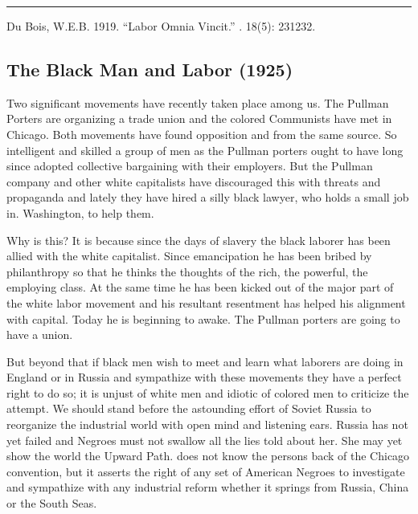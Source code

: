 \documentclass[letterpaper,10pt,english]{jupyterBook}
\begin{document}
\bigskip\hrule\bigskip


\sphinxAtStartPar
{} Du Bois, W.E.B. 1919. “Labor Omnia Vincit.” . 18(5): 231\sphinxhyphen{}232.


\subsection{The Black Man and Labor (1925)}
\label{\detokenize{Volumes/31/02/black_man_and_labor:the-black-man-and-labor-1925}}\label{\detokenize{Volumes/31/02/black_man_and_labor::doc}}
\sphinxAtStartPar
Two significant movements have recently taken place among us. The Pullman Porters are organizing a trade union and the colored Communists have met in Chicago. Both movements have found opposition and from the same source. So intelligent and skilled a group of men as the Pullman porters ought to have long since adopted collective bargaining with their employers. But the Pullman company and other white capitalists have discouraged this with threats and propaganda and lately they have hired a silly black lawyer, who holds a small job in. Washington, to help them.

\sphinxAtStartPar
Why is this? It is because since the days of slavery the black laborer has been allied with the white capitalist. Since emancipation he has been bribed by philanthropy so that he thinks the thoughts of the rich, the powerful, the employing class. At the same time he has been kicked out of the major part of the white labor movement and his resultant resentment has helped his alignment with capital. Today he is beginning to awake. The Pullman porters are going to have a union.

\sphinxAtStartPar
But beyond that if black men wish to meet and learn what laborers are doing in England or in Russia and sympathize with these movements they have a perfect right to do so; it is unjust of white men and idiotic of colored men to criticize the attempt. We should stand before the astounding effort of Soviet Russia to reorganize the industrial world with open mind and listening ears. Russia has not yet failed and Negroes must not swallow all the lies told about her. She may yet show the world the Upward Path.  does not know the persons back of the Chicago convention, but it asserts the right of any set of American Negroes to investigate and sympathize with any industrial reform whether it springs from Russia, China or the South Seas.
\end{document}

